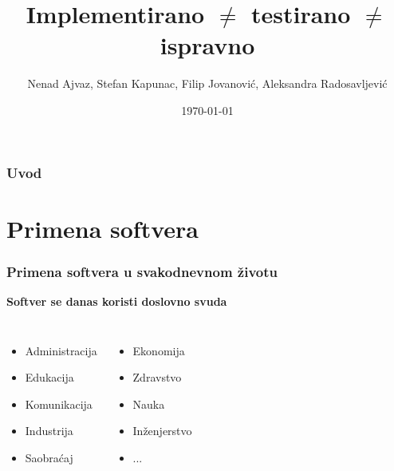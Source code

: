 \documentclass{beamer}
\title[Pouzdanost Softvera]{Implementirano $\neq$ testirano $\neq$ ispravno} %
\author{Nenad Ajvaz, Stefan Kapunac, Filip Jovanović, Aleksandra Radosavljević} %
\institute[MATF] %
{
Univerzitet u Beogradu, Matematički Fakultet \\ %
\medskip
}
\date{\today} %
\begin{document}
\begin{frame}
\titlepage %
\end{frame}

\begin{frame}
\frametitle{Uvod} %
\tableofcontents %
\end{frame}



\section{Primena softvera }
\begin{frame} 
\frametitle{Primena softvera u svakodnevnom životu}
\textbf{Softver se danas koristi doslovno svuda}

\begin{columns}[c] %
\begin{itemize}
\item Administracija
\item Edukacija
\item Komunikacija
\item Industrija
\item Saobraćaj
\end{itemize}

\begin{itemize}
\item Ekonomija
\item Zdravstvo
\item Nauka
\item Inženjerstvo
\item ...
\end{itemize}
\end{columns}
\end{frame}
\end{document}
